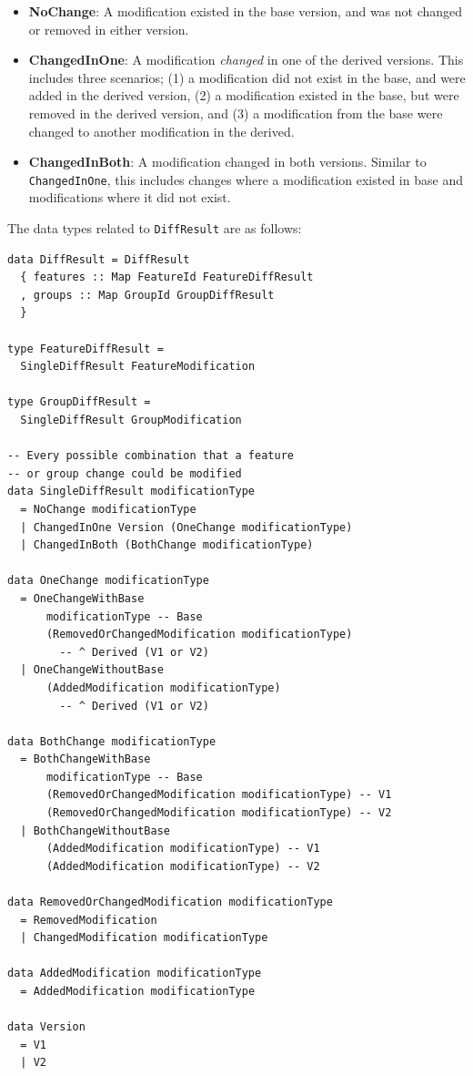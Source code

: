 \documentclass[a4paper,english]{ifimaster}
\begin{document}
\begin{itemize}
  \item \textbf{NoChange}: A modification existed in the base version, and was not changed or removed in either version.
  \item \textbf{ChangedInOne}: A modification \textit{changed} in one of the derived versions. This includes three scenarios; (1) a modification did not exist in the base, and were added in the derived version, (2) a modification existed in the base, but were removed in the derived version, and (3) a modification from the base were changed to another modification in the derived.
  \item \textbf{ChangedInBoth}: A modification changed in both versions. Similar to \texttt{ChangedInOne}, this includes changes where a modification existed in base and modifications where it did not exist.
\end{itemize}

The data types related to \texttt{DiffResult} are as follows:

\begin{verbatim}
data DiffResult = DiffResult
  { features :: Map FeatureId FeatureDiffResult
  , groups :: Map GroupId GroupDiffResult
  }

type FeatureDiffResult =
  SingleDiffResult FeatureModification

type GroupDiffResult =
  SingleDiffResult GroupModification

-- Every possible combination that a feature
-- or group change could be modified
data SingleDiffResult modificationType
  = NoChange modificationType
  | ChangedInOne Version (OneChange modificationType)
  | ChangedInBoth (BothChange modificationType)

data OneChange modificationType
  = OneChangeWithBase
      modificationType -- Base
      (RemovedOrChangedModification modificationType)
        -- ^ Derived (V1 or V2)
  | OneChangeWithoutBase
      (AddedModification modificationType) 
        -- ^ Derived (V1 or V2)

data BothChange modificationType
  = BothChangeWithBase
      modificationType -- Base
      (RemovedOrChangedModification modificationType) -- V1
      (RemovedOrChangedModification modificationType) -- V2
  | BothChangeWithoutBase
      (AddedModification modificationType) -- V1
      (AddedModification modificationType) -- V2

data RemovedOrChangedModification modificationType
  = RemovedModification
  | ChangedModification modificationType

data AddedModification modificationType
  = AddedModification modificationType

data Version
  = V1
  | V2
\end{verbatim}
\end{document}
